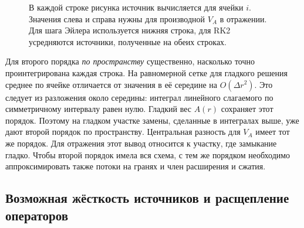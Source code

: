 \documentclass[11pt,a4paper]{article}
\providecommand{\U}{}
\renewcommand{\U}{\bm U}
\newcommand{\Src}{\bm S}
\begin{document}
\begin{figure}[htbp]
\centering
{}
\caption{В каждой строке рисунка источник вычисляется для
ячейки $i$. Значения слева и справа нужны для производной
$V_A$ в отражении. Для шага Эйлера используется нижняя строка,
для RK2 усредняются источники, полученные на обеих строках.}
\end{figure}

Для второго порядка \emph{по пространству} существенно,
насколько точно проинтегрирована каждая строка. На равномерной
сетке для гладкого решения среднее по ячейке отличается от
значения в её середине на $O(\Delta r^2)$. Это следует из
разложения около середины: интеграл линейного слагаемого
по симметричному интервалу равен нулю. Гладкий вес $A(r)$
сохраняет этот порядок. Поэтому на гладком участке замены,
сделанные в интегралах выше, уже дают второй порядок по
пространству. Центральная разность для $V_A$ имеет тот же
порядок. Для отражения этот вывод относится к участку,
где замыкание гладко. Чтобы второй порядок имела вся схема,
с тем же порядком необходимо аппроксимировать также потоки
на гранях и член расширения и сжатия.

\subsection{Возможная жёсткость источников и расщепление операторов}
\end{document}

